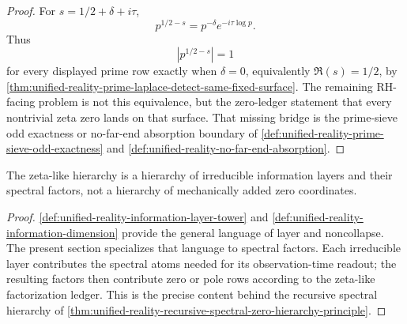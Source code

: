 \begin{proof}
For $s=1/2+\delta+i\tau$,
$$
p^{1/2-s}=p^{-\delta}e^{-i\tau\log p}.
$$
Thus
$$
|p^{1/2-s}|=1
$$
for every displayed prime row exactly when $\delta=0$, equivalently
$\Re(s)=1/2$, by
\autoref{thm:unified-reality-prime-laplace-detect-same-fixed-surface}.
The remaining RH-facing problem is not this equivalence, but the
zero-ledger statement that every nontrivial zeta zero lands on that
surface.  That missing bridge is the prime-sieve odd exactness or
no-far-end absorption boundary of
\autoref{def:unified-reality-prime-sieve-odd-exactness} and
\autoref{def:unified-reality-no-far-end-absorption}.
\end{proof}

\begin{corollary}
\label{cor:unified-reality-information-layers-explain-spectral-hierarchy}
The zeta-like hierarchy is a hierarchy of irreducible information layers
and their spectral factors, not a hierarchy of mechanically added zero
coordinates.
\end{corollary}

\begin{proof}
\autoref{def:unified-reality-information-layer-tower} and
\autoref{def:unified-reality-information-dimension} provide the general
language of layer and noncollapse.  The present section specializes that
language to spectral factors.  Each irreducible layer contributes the
spectral atoms needed for its observation-time readout; the resulting
factors then contribute zero or pole rows according to the zeta-like
factorization ledger.  This is the precise content behind the recursive
spectral hierarchy of
\autoref{thm:unified-reality-recursive-spectral-zero-hierarchy-principle}.
\end{proof}
